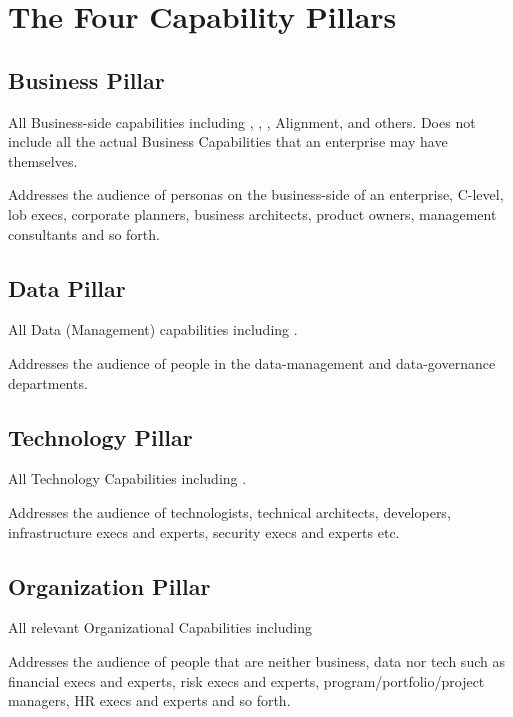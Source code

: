 \section{The Four Capability Pillars}


\subsection{Business Pillar}

All Business-side capabilities including ,
 ,
 , Alignment,
 and others.
Does not include all the actual Business Capabilities  that
an enterprise may have themselves.

Addresses the audience of personas on the business-side of an enterprise, C-level,
\gls{lob} execs,
corporate planners,
business architects, product owners,
management consultants and so forth.

\subsection{Data Pillar}

All Data (Management) capabilities including .

Addresses the audience of people in the data-management and data-governance departments.

\subsection{Technology Pillar}

All Technology Capabilities including .

Addresses the audience of technologists, technical architects, developers, infrastructure execs and experts,
security execs and experts etc.

\subsection{Organization Pillar}

All relevant Organizational Capabilities including 

Addresses the audience of people that are neither business, data nor tech such as financial execs and experts, risk
execs and experts, program/portfolio/project managers, HR execs and experts and so forth.

